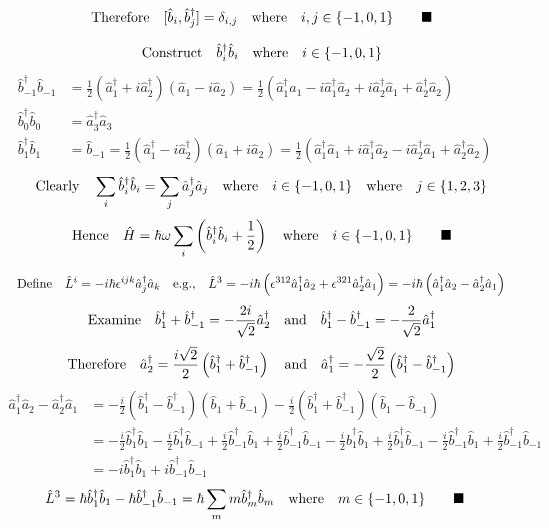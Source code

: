 \documentclass{amsart}
\begin{document}
\[\qq{Therefore}[\hat{b}_{i},\hat{b}^\dagger_{j}]=\delta_{i,j}\qq{where}i,j\in\{-1,0,1\}\qquad\blacksquare\]

\[\qq{Construct}\hat{b}^\dagger_i\hat{b}_i\qq{where}i\in\{-1,0,1\}\]
\begin{align*}
\hat{b}^\dagger_{-1}\hat{b}_{-1}&=\frac{1}{2}\left(\hat{a}^\dagger_1+i\hat{a}^\dagger_2\right)\left(\hat{a}_1-i\hat{a}_2\right)=\frac{1}{2}\left(\hat{a}^\dagger_1\hat{a}_1-i\hat{a}^\dagger_1\hat{a}_2+i\hat{a}^\dagger_2\hat{a}_1+\hat{a}^\dagger_2\hat{a}_2\right)\\
\hat{b}^\dagger_0\hat{b}_0&=\hat{a}^\dagger_3\hat{a}_3\\
\hat{b}^\dagger_1\hat{b}_1&=\hat{b}_{-1}=\frac{1}{2}\left(\hat{a}^\dagger_1-i\hat{a}^\dagger_2\right)\left(\hat{a}_1+i\hat{a}_2\right)=\frac{1}{2}\left(\hat{a}^\dagger_1\hat{a}_1+i\hat{a}^\dagger_1\hat{a}_2-i\hat{a}^\dagger_2\hat{a}_1+\hat{a}^\dagger_2\hat{a}_2\right)
\end{align*}
\[\qq{Clearly}\sum_i \hat{b}^\dagger_{i}\hat{b}_{i}=\sum_j \hat{a}^\dagger_{j}\hat{a}_{j}\qq{where}i\in\{-1,0,1\}\qq{where}j\in\{1,2,3\}\]
\[\qq{Hence}\hat{H}=\hbar\omega\sum_i\left(\hat{b}^\dagger_i\hat{b}_i+\frac{1}{2}\right)\qq{where}i\in\{-1,0,1\}\qquad\blacksquare\]

\[\qq{Define}\hat{L}^i=-i\hbar \epsilon^{ijk}\hat{a}^\dagger_j\hat{a}_k\qq{e.g.,}\hat{L}^3=-i\hbar\left(\epsilon^{312}\hat{a}^\dagger_1\hat{a}_2 +\epsilon^{321}\hat{a}^\dagger_2\hat{a}_1\right)=-i\hbar\left(\hat{a}^\dagger_1\hat{a}_2 -\hat{a}^\dagger_2\hat{a}_1\right)\]
\[\qq{Examine}\hat{b}^\dagger_1+\hat{b}^\dagger_{-1}=-\frac{2i}{\sqrt{2}}\hat{a}^\dagger_2 \qq{and}\hat{b}^\dagger_1-\hat{b}^\dagger_{-1}=-\frac{2}{\sqrt{2}}\hat{a}^\dagger_1    \]
\[\qq{Therefore}\hat{a}^\dagger_2=\frac{i\sqrt{2}}{2}\left(\hat{b}^\dagger_1+\hat{b}^\dagger_{-1}\right) \qq{and}\hat{a}^\dagger_1=-\frac{\sqrt{2}}{2}\left(\hat{b}^\dagger_1-\hat{b}^\dagger_{-1} \right)   \]
\begin{align*}
\hat{a}^\dagger_1\hat{a}_2 -\hat{a}^\dagger_2\hat{a}_1&=-\frac{i}{2}\left(\hat{b}^\dagger_1-\hat{b}^\dagger_{-1} \right)\left(\hat{b}_1+\hat{b}_{-1}\right)-\frac{i}{2}\left(\hat{b}^\dagger_1+\hat{b}^\dagger_{-1}\right)\left(\hat{b}_1-\hat{b}_{-1}\right)\\
&=-\frac{i}{2}\hat{b}^\dagger_1 \hat{b}_1-\frac{i}{2}\hat{b}^\dagger_1 \hat{b}_{-1}+\frac{i}{2}\hat{b}^\dagger_{-1} \hat{b}_1+\frac{i}{2}\hat{b}^\dagger_{-1} \hat{b}_{-1}-\frac{i}{2}\hat{b}^\dagger_1 \hat{b}_1+\frac{i}{2}\hat{b}^\dagger_1 \hat{b}_{-1}-\frac{i}{2}\hat{b}^\dagger_{-1} \hat{b}_1+\frac{i}{2}\hat{b}^\dagger_{-1} \hat{b}_{-1}\\
&=-i\hat{b}^\dagger_1 \hat{b}_1+i\hat{b}^\dagger_{-1} \hat{b}_{-1}
\end{align*}
\[\hat{L}^3=\hbar\hat{b}^\dagger_1 \hat{b}_1-\hbar\hat{b}^\dagger_{-1} \hat{b}_{-1}=\hbar\sum_m m\hat{b}^\dagger_m \hat{b}_m\qq{where}m\in\{-1,0,1\}\qquad\blacksquare\]
\end{document}
